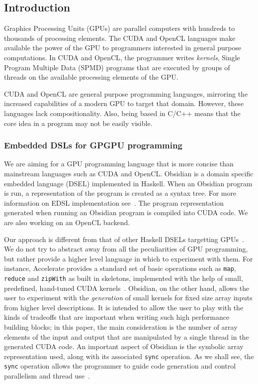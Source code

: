 

\subsection{Introduction} 

%


Graphics Processing Units (GPUs) are parallel computers with hundreds 
to thousands of processing elements. The CUDA and OpenCL languages  
make available the power of the GPU to programmers interested in general 
purpose computations. In CUDA and OpenCL, the programmer writes {\em kernels}, 
Single Program Multiple Data (SPMD) programs that are executed by groups 
of threads on the available processing elements of the GPU.  

CUDA and OpenCL are general purpose programming languages, mirroring the 
increased capabilities of a modern GPU to target that domain. However, these 
languages lack compositionality. 
Also, being based in C/C++ means that the core idea in a program may
not be easily visible.  

\subsubsection{Embedded DSLs for GPGPU programming} 
We are aiming for a GPU programming language that is more
concise than mainstream
languages such as CUDA and OpenCL. 
Obsidian is a
domain specific embedded language (DSEL) implemented in Haskell.
When an Obsidian program is run, a representation of the program is created 
as a syntax tree. For more information on EDSL implementation see~.
The program representation generated when running an Obsidian program 
is compiled into CUDA code. We are also working on an OpenCL backend.

Our approach is different from that of other Haskell DSELs targetting
GPUs~. 
We do not try to abstract away from 
all the peculiarities of GPU programming, but rather provide a higher 
level language in which to experiment with them.
For instance,
Accelerate provides a standard set of basic operations such as 
{\tt map}, {\tt reduce} and {\tt zipWith} as built in skeletons, implemented
with the help of small, predefined, hand-tuned CUDA kernels~. 
Obsidian, on the other hand, allows the user to experiment with the
{\em generation} of small kernels for fixed size array inputs
from higher level descriptions.
It is intended to allow the user to play with the kinds of tradeoffs that are important
when writing such high performance building blocks; in this paper, the main consideration
is the number of array elements of the input and output that are manipulated
by a single thread in the generated CUDA code.
An important aspect of Obsidian is the symbolic array representation used, along
with its associated {\tt sync} operation. As we shall see, the {\tt sync} operation
allows the programmer to guide code generation and control parallelism and thread
use~.




